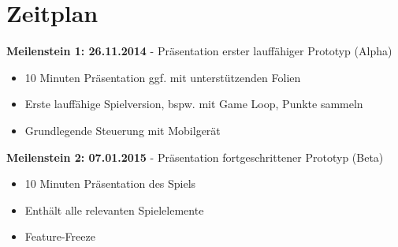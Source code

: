 \section{Zeitplan}

\textbf{Meilenstein 1: 26.11.2014} - Präsentation erster lauffähiger Prototyp (Alpha)
\begin{itemize}
\item 10 Minuten Präsentation ggf. mit unterstützenden Folien
\item Erste lauffähige Spielversion, bspw. mit Game Loop, Punkte sammeln
\item Grundlegende Steuerung mit Mobilgerät
\end{itemize}
\textbf{Meilenstein 2: 07.01.2015} - Präsentation fortgeschrittener Prototyp (Beta)
\begin{itemize}
\item 10 Minuten Präsentation des Spiels
\item Enthält alle relevanten Spielelemente
\item Feature-Freeze
\end{itemize}
